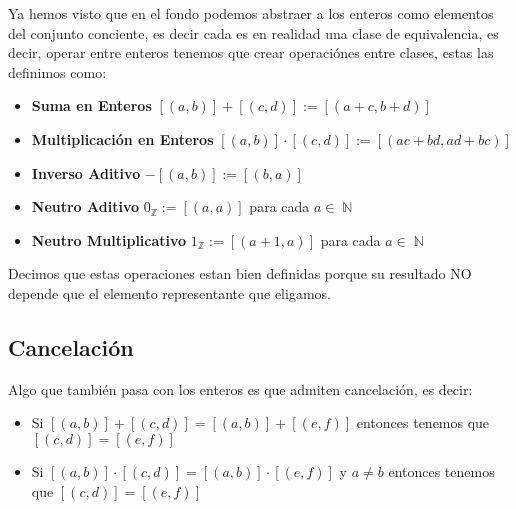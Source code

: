 \documentclass[12pt, fleqn]{report}                             %
\newcommand \Quote {\qq}                                        %
\DeclareMathOperator \Naturals  {\mathbb{N}}                     %
\DeclareMathOperator \Integers  {\mathbb{Z}}                     %
\begin{document}
            Ya hemos visto que en el fondo podemos abstraer a los enteros como elementos del
            conjunto conciente, es decir cada \Quote{número entero} es en realidad una clase
            de equivalencia, es decir, operar entre enteros tenemos que crear operaciónes entre
            clases, estas las definimos como:

            \begin{itemize}
                \item
                    \textbf{Suma en Enteros}
                    $[(a,b)] + [(c,d)] := [(a+c, b+d)]$

                \item
                    \textbf{Multiplicación en Enteros}
                    $[(a,b)] \cdot [(c,d)] := [(ac+bd, ad+bc)]$

                \item
                    \textbf{Inverso Aditivo}
                    $-[(a,b)] := [(b,a)]$

                \item
                    \textbf{Neutro Aditivo}
                    $0_{\Integers} := [(a,a)]$ para cada $a \in \Naturals$

                 \item
                    \textbf{Neutro Multiplicativo}
                    $1_{\Integers} := [(a+1,a)]$ para cada $a \in \Naturals$
            \end{itemize}


            Decimos que estas operaciones estan bien definidas porque su resultado NO depende que 
            el elemento representante que eligamos.


            \subsection*{Cancelación}

                Algo que también pasa con los enteros es que admiten cancelación, es decir:
                \begin{itemize}
                    \item
                        Si  $[(a,b)] + [(c,d)] = [(a,b)] + [(e,f)]$ entonces tenemos que
                        $[(c,d)] = [(e,f)]$

                    \item
                        Si  $[(a,b)] \cdot [(c,d)] = [(a,b)] \cdot [(e,f)]$ y $a \neq b$ entonces
                        tenemos que $[(c,d)] = [(e,f)]$
                \end{itemize}
\end{document}
